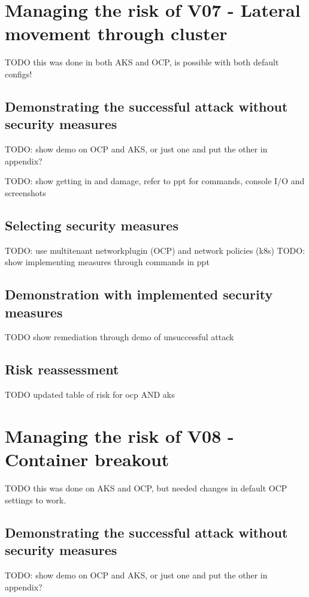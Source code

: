 \section{Managing the risk of V07 - Lateral movement through cluster}
TODO this was done in both AKS and OCP, is possible with both default configs!

\subsection{Demonstrating the successful attack without security measures}
TODO: show demo on OCP and AKS, or just one and put the other in appendix?

TODO: show getting in and damage, refer to ppt for commands, console I/O and screenshots

\subsection{Selecting security measures}
TODO: use multitenant networkplugin (OCP) and network policies (k8s)
TODO: show implementing measures through commands in ppt

\subsection{Demonstration with implemented security measures}
TODO show remediation through demo of unsuccessful attack

\subsection{Risk reassessment}
TODO updated table of risk for ocp AND aks

\section{Managing the risk of V08 - Container breakout}
TODO this was done on AKS and OCP, but needed changes in default OCP settings to work.

\subsection{Demonstrating the successful attack without security measures}
TODO: show demo on OCP and AKS, or just one and put the other in appendix?

